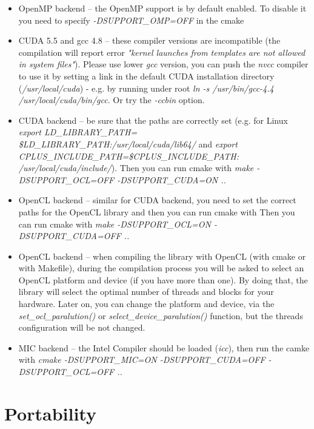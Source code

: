 \begin{itemize}
\itemsep0em

\item OpenMP backend -- the OpenMP support is by default enabled. To disable it you need to specify \emph{-DSUPPORT\_OMP=OFF} in the cmake

\item CUDA 5.5 and gcc 4.8 -- these compiler versions are incompatible (the compilation will report error \emph{"kernel launches from templates are not allowed in system files"}). Please use lower \emph{gcc} version, you can push the \emph{nvcc} compiler to use it by setting a link in the default CUDA installation directory (\emph{/usr/local/cuda}) - e.g. by running under root \emph{ln -s /usr/bin/gcc-4.4 /usr/local/cuda/bin/gcc}. Or try the \emph{-ccbin} option.

\item CUDA backend -- be sure that the paths are correctly set (e.g. for Linux \emph{export LD\_LIBRARY\_PATH= \$LD\_LIBRARY\_PATH:/usr/local/cuda/lib64/} and \emph{export CPLUS\_INCLUDE\_PATH=\$CPLUS\_INCLUDE\_PATH: /usr/local/cuda/include/}). Then you can run cmake with \emph{make  -DSUPPORT\_OCL=OFF -DSUPPORT\_CUDA=ON ..}

\item OpenCL backend -- similar for CUDA backend, you need to set the correct paths for the OpenCL library and then you can run cmake with Then you can run cmake with \emph{make  -DSUPPORT\_OCL=ON -DSUPPORT\_CUDA=OFF ..}

\item OpenCL backend -- when compiling the library with OpenCL (with cmake or with Makefile), during the compilation process you will be asked to select an OpenCL platform and device (if you have more than one). By doing that, the library will select the optimal number of threads and blocks for your hardware. Later on, you can change the platform and device, via the \emph{set\_ocl\_paralution()} or \emph{select\_device\_paralution()} function, but the threads configuration will be not changed. 

\item MIC backend -- the Intel Compiler should be loaded (\emph{icc}), then run the camke with \emph{cmake -DSUPPORT\_MIC=ON -DSUPPORT\_CUDA=OFF -DSUPPORT\_OCL=OFF  ..}

\end{itemize}



\section{Portability}

